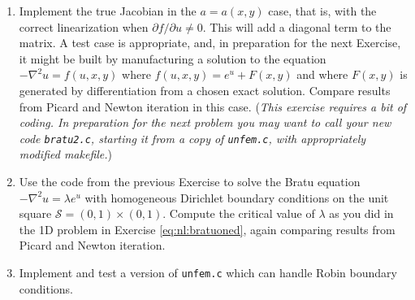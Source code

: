 \begin{enumerate}
\item \label{exer:un:truejacobian} Implement the true Jacobian in the $a=a(x,y)$ case, that is, with the correct linearization when $\partial f/\partial u\ne 0$.  This will add a diagonal term to the matrix.  A test case is appropriate, and, in preparation for the next Exercise, it might be built by manufacturing a solution to the equation $-\nabla^2 u = f(u,x,y)$ where $f(u,x,y) = e^u + F(x,y)$ and where $F(x,y)$ is generated by differentiation from a chosen exact solution.  Compare results from Picard and Newton iteration in this case.  (\emph{This exercise requires a bit of coding.  In preparation for the next problem you may want to call your new code \texttt{bratu2.c}, starting it from a copy of \texttt{unfem.c}, with appropriately modified makefile.})
\item \label{exer:un:bratu} Use the code from the previous Exercise to solve the Bratu equation $-\nabla^2 u = \lambda e^u$ with homogeneous Dirichlet boundary conditions on the unit square $\mathcal{S}=(0,1)\times(0,1)$.  Compute the critical value of $\lambda$ as you did in the 1D problem in Exercise \ref{eq:nl:bratuoned}, again comparing results from Picard and Newton iteration.
\item \label{exer:un:robin} Implement and test a version of \texttt{unfem.c} which can handle Robin boundary conditions.
\end{enumerate}

